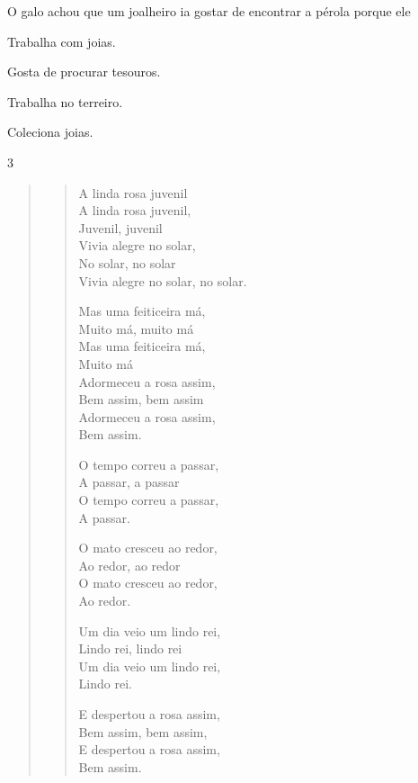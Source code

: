 O galo achou que um joalheiro ia gostar de encontrar a pérola porque ele

\begin{escolha}
\item Trabalha com joias.

\item Gosta de procurar tesouros.

\item Trabalha no terreiro.

\item Coleciona joias.
\end{escolha}


\num{3}

\begin{quote}
\begin{verse}
A linda rosa juvenil\\
A linda rosa juvenil,\\
Juvenil, juvenil\\
Vivia alegre no solar,\\
No solar, no solar\\
Vivia alegre no solar, no solar.

Mas uma feiticeira má,\\
Muito má, muito má\\
Mas uma feiticeira má,\\
Muito má\\
Adormeceu a rosa assim,\\
Bem assim, bem assim\\
Adormeceu a rosa assim,\\
Bem assim.

O tempo correu a passar,\\
A passar, a passar\\
O tempo correu a passar,\\
A passar.

O mato cresceu ao redor,\\
Ao redor, ao redor\\
O mato cresceu ao redor,\\
Ao redor.

Um dia veio um lindo rei,\\
Lindo rei, lindo rei\\
Um dia veio um lindo rei,\\
Lindo rei.

E despertou a rosa assim,\\
Bem assim, bem assim,\\
E despertou a rosa assim,\\
Bem assim.
\end{verse}

\end{quote}

